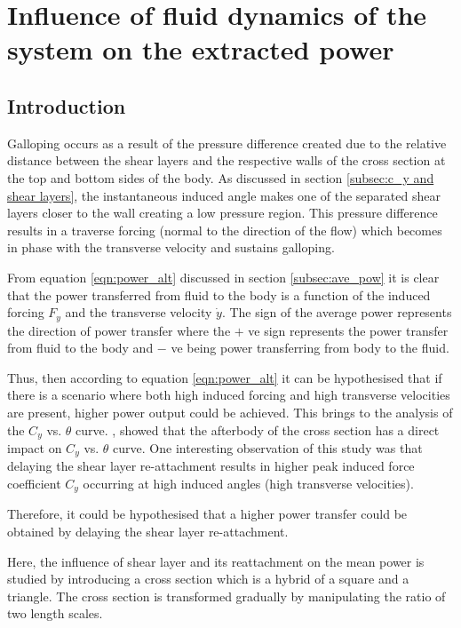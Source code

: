 \chapter{Influence of fluid dynamics of the system on the extracted power}

\section{Introduction}

Galloping occurs as a result of the pressure difference created due to the relative distance between the shear layers and the respective walls of the cross section at the top and bottom sides of the body. As discussed in section \ref{subsec:c_y and shear layers}, the instantaneous induced angle makes one of the separated shear layers closer to the wall creating a low pressure region. This pressure difference results in a traverse forcing (normal to the direction of the flow) which becomes in phase with the transverse velocity and sustains galloping. 

From equation \ref{eqn:power_alt} discussed in section \ref{subsec:ave_pow} it is clear that the power transferred from fluid to the body is a function of the induced forcing $F_y$ and the transverse velocity $\dot{y}$. The sign of the average power represents the direction of power transfer where the $+$ ve sign represents the power transfer from fluid to the body and $-$ ve being power transferring from body to the fluid. 

Thus, then  according to equation \ref{eqn:power_alt} it can be hypothesised that if there is a scenario where both high induced forcing and high transverse velocities are present, higher power output could be achieved. This brings to the analysis of the $C_y$ vs. $\theta$ curve. \citet{Luo1994}, showed that the afterbody of the cross section has a direct impact on $C_y$ vs. $\theta$ curve. One interesting observation of this study was that delaying the shear layer re-attachment results in higher peak induced force coefficient $C_y$ occurring at high induced angles (high transverse velocities).    

Therefore, it could be hypothesised that a higher power transfer could be obtained by delaying the shear layer re-attachment. 

Here, the influence of shear layer and its reattachment on the mean power is studied by introducing a cross section which is a hybrid of a square and a triangle. The cross section is transformed gradually by manipulating the ratio of two length scales.

